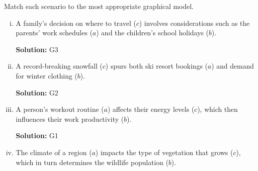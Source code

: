 \documentclass{article}
\newenvironment{solution}{\color{blue} \smallskip \textbf{Solution:}}{}
\begin{document}
\begin{enumerate}[(a)]
\begin{center}
    \end{center}
    Match each scenario to the most appropriate graphical model.
    \begin{enumerate}[(i)]
        \item 
        A family’s decision on where to travel (\(c\)) involves considerations such as the parents' work schedules (\(a\)) and the children’s school holidays (\(b\)).

        \begin{solution}
            G3
        \end{solution}
        
        \item 
        A record-breaking snowfall (\(c\)) spurs both ski resort bookings (\(a\)) and demand for winter clothing (\(b\)).

        \begin{solution}
            G2
        \end{solution}

        \item 
        A person's workout routine (\(a\)) affects their energy levels (\(c\)), which then influences their work productivity (\(b\)).

        \begin{solution}
            G1
        \end{solution}

        \item 
        The climate of a region (\(a\)) impacts the type of vegetation that grows (\(c\)), which in turn determines the wildlife population (\(b\)).


\end{enumerate}
\end{enumerate}
\end{document}
